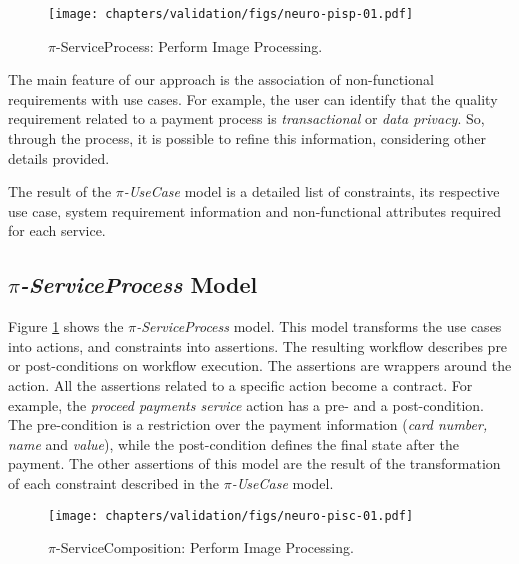 

\begin{figure}[ht!]
\centering
\texttt{[image: chapters/validation/figs/neuro-pisp-01.pdf]}
\caption{$\pi$-ServiceProcess: Perform Image Processing.}
\label{fig:piServiceProcess-imageProcessing}
\end{figure} 

The main feature of our approach is the association of non-functional
requirements with use cases. For example, the user can identify that the
quality requirement related to a payment process is
\textit{transactional} or \textit{data privacy}. So, through the process, it is
possible to refine this information, considering other details provided.

The result of the \textit{$\pi$-UseCase} model is a detailed list of
constraints, its respective use case, system requirement information and
non-functional attributes required for each service.

\subsection{\textit{$\pi$-ServiceProcess} Model}

Figure \ref{fig:piServiceProcess-imageProcessing} shows the
\textit{$\pi$-ServiceProcess} model. This model transforms the use cases into actions,
and constraints into assertions. The resulting workflow describes pre or
post-conditions on workflow execution. The assertions are wrappers around the
action. All the assertions related to a specific action become a
contract. For example, the \textit{proceed payments service} action has a
pre- and a post-condition. The pre-condition is a restriction over the payment
information (\textit{card number, name} and \textit{value}), while the
post-condition defines the final state after the payment. The other assertions
of this model are the result of the transformation of each constraint described
in the \textit{$\pi$-UseCase} model. 
 
 
 \begin{figure}[ht!]
\centering
\texttt{[image: chapters/validation/figs/neuro-pisc-01.pdf]}
\caption{$\pi$-ServiceComposition: Perform Image Processing.}
\label{fig:piServiceComposition-imageProcessing}
\end{figure} 

